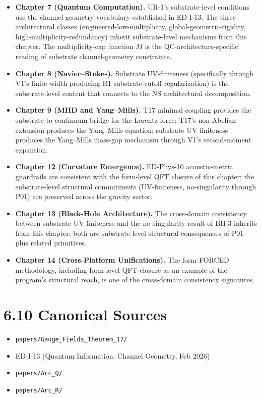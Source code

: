 \documentclass[11pt]{book}
\begin{document}
\begin{itemize}
\item \textbf{Chapter 7 (Quantum Computation).} UR-1's substrate-level conditions use the channel-geometry vocabulary established in ED-I-13. The three architectural classes (engineered-low-multiplicity, global-geometric-rigidity, high-multiplicity-redundancy) inherit substrate-level mechanisms from this chapter. The multiplicity-cap function $M$ is the QC-architecture-specific reading of substrate channel-geometry constraints.
\item \textbf{Chapter 8 (Navier–Stokes).} Substrate UV-finiteness (specifically through V1's finite width producing R1 substrate-cutoff regularization) is the substrate-level content that connects to the NS architectural decomposition.
\item \textbf{Chapter 9 (MHD and Yang–Mills).} T17 minimal coupling provides the substrate-to-continuum bridge for the Lorentz force; T17's non-Abelian extension produces the Yang–Mills equation; substrate UV-finiteness produces the Yang–Mills mass-gap mechanism through V1's second-moment expansion.
\item \textbf{Chapter 12 (Curvature Emergence).} ED-Phys-10 acoustic-metric guardrails are consistent with the form-level QFT closure of this chapter; the substrate-level structural commitments (UV-finiteness, no-singularity through P01) are preserved across the gravity sector.
\item \textbf{Chapter 13 (Black-Hole Architecture).} The cross-domain consistency between substrate UV-finiteness and the no-singularity result of BH-3 inherits from this chapter; both are substrate-level structural consequences of P01 plus related primitives.
\item \textbf{Chapter 14 (Cross-Platform Unifications).} The form-FORCED methodology, including form-level QFT closure as an example of the program's structural reach, is one of the cross-domain consistency signatures.
\end{itemize}

\section{6.10 Canonical Sources}

\begin{itemize}
\item \texttt{papers/Gauge\_Fields\_Theorem\_17/}
\item ED-I-13 (Quantum Information: Channel Geometry, Feb 2026)
\item \texttt{papers/Arc\_Q/}
\item \texttt{papers/Arc\_R/}
\end{itemize}
\end{document}
